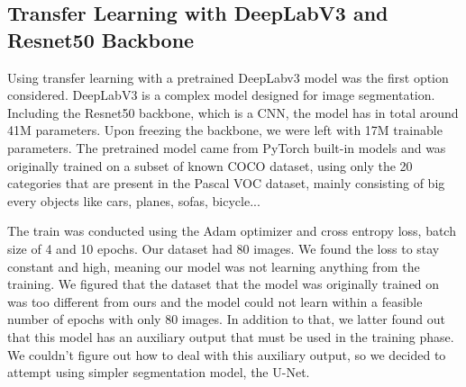 \subsection{Transfer Learning with DeepLabV3 and Resnet50 Backbone}

Using transfer learning with a pretrained DeepLabv3 model was the first option considered. DeepLabV3 is a complex model designed for
image segmentation. Including the Resnet50 backbone, which is a CNN, the model has in total around 41M parameters. Upon freezing the
backbone, we were left with 17M trainable parameters. The pretrained model came from PyTorch built-in models and was originally trained
on a subset of known COCO dataset, using only the 20 categories that are present in the Pascal VOC dataset, mainly consisting of big
every objects like cars, planes, sofas, bicycle...

The train was conducted using the Adam optimizer and cross entropy loss, batch size of 4 and 10 epochs. Our dataset had 80 images. We
found the loss to stay constant and high, meaning our model was not learning anything from the training. We figured that the dataset
that the model was originally trained on was too different from ours and the model could not learn within a feasible number of epochs
with only 80 images. In addition to that, we latter found out that this model has an auxiliary output that must be used in the training 
phase. We couldn't figure out how to deal with this auxiliary output, so we decided to attempt using simpler segmentation model, the U-Net.
